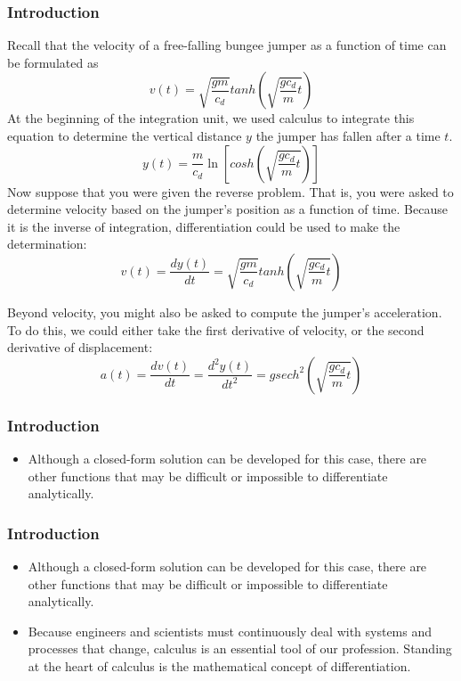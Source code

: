 \documentclass{if-beamer}
\begin{document}
\begin{frame}[t]
	\frametitle{Introduction}
	Recall that the velocity of a free-falling bungee jumper as a function of time can be
	formulated as
	$$ v(t) = \sqrt{\frac{gm}{c_d}}tanh\left(\sqrt{\frac{gc_d}{m}t}\right) $$
	At the beginning of the integration unit, we used calculus to integrate this equation to determine the
	vertical distance $y$ the jumper has fallen after a time $t$.
	$$y(t) = \frac{m}{c_d}\ln\left[cosh\left( \sqrt{\frac{gc_d}{m}t} \right) \right]$$
	Now suppose that you were given the reverse problem. That is, you were asked to
	determine velocity based on the jumper’s position as a function of time. Because it is the inverse of integration, differentiation could be used to make the determination:
	$$v(t) = \frac{dy(t)}{dt} = \sqrt{\frac{gm}{c_d}}tanh\left(\sqrt{\frac{gc_d}{m}t}\right) $$
	
	Beyond velocity, you might also be asked to compute the jumper’s acceleration. To
	do this, we could either take the first derivative of velocity, or the second derivative of
	displacement:
	$$a(t) = \frac{dv(t)}{dt} = \frac{d^2y(t)}{dt^2} = gsech^2\left( \sqrt{\frac{gc_d}{m}t} \right)$$
	
	\end{frame}

\begin{frame}[t]
	\frametitle{Introduction}
	\begin{itemize}
		\item Although a closed-form solution can be developed for this case, there are other functions that may be difficult or impossible to differentiate analytically. \vspace{1cm}
	\end{itemize}
\end{frame}

\begin{frame}[t]
	\frametitle{Introduction}
	\begin{itemize}
		\item Although a closed-form solution can be developed for this case, there are other functions that may be difficult or impossible to differentiate analytically. \vspace{1cm}
		\item Because engineers and scientists must continuously deal with systems and processes that change, calculus is an essential tool of our
		profession. Standing at the heart of calculus is the mathematical concept of differentiation. \vspace{1cm}
	\end{itemize}
\end{frame}
\end{document}
